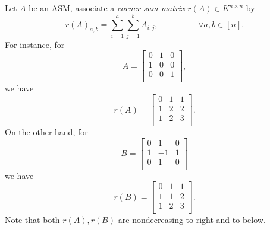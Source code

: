 \documentclass[co439]{subfiles}
\begin{document}
    \begin{example}{}
        Let $A$ be an ASM, associate a \emph{corner-sum matrix} $r\left( A \right)\in K^{n\times n}$ by
        \begin{equation*}
            r\left( A \right)_{a,b} = \sum^{a}_{i=1} \sum^{b}_{j=1} A_{i,j}, \hspace{2cm}\forall a,b\in\left[ n \right].
        \end{equation*}
        For instance, for
        \begin{equation*}
            A =
            \begin{bmatrix}
            	0 & 1 & 0 \\
            	1 & 0 & 0 \\
            	0 & 0 & 1 \\
            \end{bmatrix},
        \end{equation*}
        we have
        \begin{equation*}
            r\left( A \right) = 
            \begin{bmatrix}
            	0 & 1 & 1 \\
            	1 & 2 & 2 \\
            	1 & 2 & 3 \\
            \end{bmatrix}.
        \end{equation*}
        On the other hand, for
        \begin{equation*}
            B = 
            \begin{bmatrix}
                    0 & 1 & 0 \\
                    1 & -1 & 1 \\
                    0 & 1 & 0 \\
            \end{bmatrix}
        \end{equation*}
        we have
        \begin{equation*}
            r\left( B \right) =
            \begin{bmatrix}
            	0 & 1 & 1 \\
            	1 & 1 & 2 \\
            	1 & 2 & 3 \\
            \end{bmatrix}.
        \end{equation*}
        Note that both $r\left( A \right),r\left( B \right)$ are nondecreasing to right and to below.
    \end{example}
\end{document}
